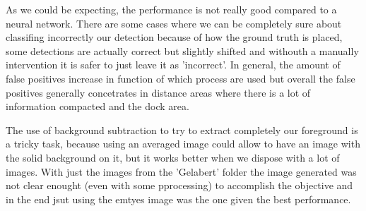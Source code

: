 \documentclass[11pt]{article}
\begin{document}
As we could be expecting, the performance is not really good compared to a neural network. There are some cases where we can be completely sure about classifing incorrectly our detection because of how the ground truth is placed, some detections are actually correct but slightly shifted and withouth a manually intervention it is safer to just leave it as 'incorrect'. In general, the amount of false positives increase in function of which process are used but overall the false positives generally concetrates in distance areas where there is a lot of information compacted and the dock area.\newline

The use of background subtraction to try to extract completely our foreground is a tricky task, because using an averaged image could allow to have an image with the solid background on it, but it works better when we dispose with a lot of images. With just the images from the 'Gelabert' folder the image generated was not clear enought (even with some pprocessing) to accomplish the objective and in the end jsut using the emtyes image was the one given the best performance.\newline
\end{document}
